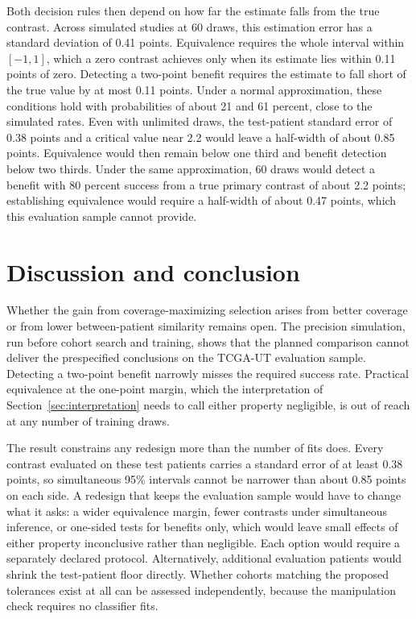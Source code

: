 Both decision rules then depend on how far the estimate falls from the true contrast. Across simulated studies at 60 draws, this estimation error has a standard deviation of 0.41 points. Equivalence requires the whole interval within $[-1,1]$, which a zero contrast achieves only when its estimate lies within 0.11 points of zero. Detecting a two-point benefit requires the estimate to fall short of the true value by at most 0.11 points. Under a normal approximation, these conditions hold with probabilities of about 21 and 61 percent, close to the simulated rates. Even with unlimited draws, the test-patient standard error of 0.38 points and a critical value near 2.2 would leave a half-width of about 0.85 points. Equivalence would then remain below one third and benefit detection below two thirds. Under the same approximation, 60 draws would detect a benefit with 80 percent success from a true primary contrast of about 2.2 points; establishing equivalence would require a half-width of about 0.47 points, which this evaluation sample cannot provide.

\section{Discussion and conclusion}
\label{sec:discussion}
Whether the gain from coverage-maximizing selection arises from better coverage or from lower between-patient similarity remains open. The precision simulation, run before cohort search and training, shows that the planned comparison cannot deliver the prespecified conclusions on the TCGA-UT evaluation sample. Detecting a two-point benefit narrowly misses the required success rate. Practical equivalence at the one-point margin, which the interpretation of Section~\ref{sec:interpretation} needs to call either property negligible, is out of reach at any number of training draws.

The result constrains any redesign more than the number of fits does. Every contrast evaluated on these test patients carries a standard error of at least 0.38 points, so simultaneous 95\% intervals cannot be narrower than about 0.85 points on each side. A redesign that keeps the evaluation sample would have to change what it asks: a wider equivalence margin, fewer contrasts under simultaneous inference, or one-sided tests for benefits only, which would leave small effects of either property inconclusive rather than negligible. Each option would require a separately declared protocol. Alternatively, additional evaluation patients would shrink the test-patient floor directly. Whether cohorts matching the proposed tolerances exist at all can be assessed independently, because the manipulation check requires no classifier fits.

